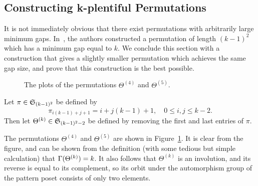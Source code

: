 \subsection{Constructing k-plentiful Permutations}

  It is not immediately obvious that there exist permutations with arbitrarily
  large minimum gaps. In~\cite{Flynn2007}, the authors constructed a
  permutation of length $(k-1)^2$ which has a minimum gap equal to $k$. 
  We conclude this section with a construction that gives a slightly smaller
  permutation which achieves the same gap size, and prove that this
  construction is the best possible. 

  \begin{figure}[t]
    \centering
     \hspace{4pc}
    \caption{The plots of the permutations $\Theta^{(4)}$ and $\Theta^{(5)}$.}
    \label{fixpat:fig:thetan}
  \end{figure}

  \begin{definition}
    Let $\pi \in \S_{(k-1)^2}$ be defined by 
    $$\pi_{i(k-1) + j + 1} = i + j(k-1) + 1, \quad 0 \leq i,j \leq k-2.$$
    Then let $\Theta^{(k)} \in \S_{(k-1)^2 - 2}$ be defined by removing the first
    and last entries of $\pi$. 
  \end{definition}



  
  The permutations $\Theta^{(4)}$ and $\Theta^{(5)}$ are shown in
  Figure~\ref{fixpat:fig:thetan}. It is clear from the figure, and can be
  shown from the definition (with some tedious but simple calculation) that
  $\Gam(\Theta^{(k)}) = k$. It also follows that $\Theta^{(k)}$ is an
  involution, and its reverse is equal to its complement, so its orbit
  under the automorphism group of the pattern poset consists of only two
  elements. 

